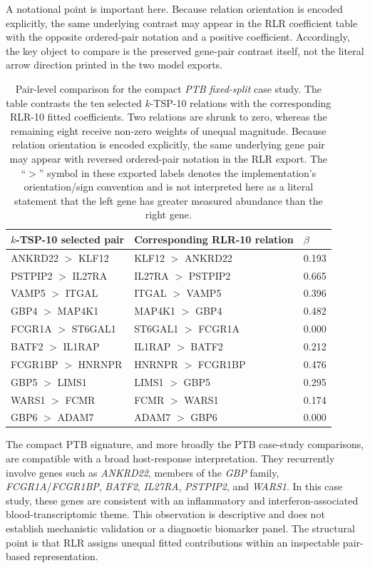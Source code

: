 \documentclass[11pt, a4paper]{article}
\newcommand{\stdtablefont}{\small}
\newcommand{\stdtablelayout}{%
  \stdtablefont
  \setlength{\tabcolsep}{4pt}
  \renewcommand{\arraystretch}{1.2}
}
\begin{document}
A notational point is important here. Because relation orientation is encoded explicitly, the same underlying contrast may appear in the RLR coefficient table with the opposite ordered-pair notation and a positive coefficient. Accordingly, the key object to compare is the preserved gene-pair contrast itself, not the literal arrow direction printed in the two model exports.

\begin{table}[!htbp]
\centering
\caption{Pair-level comparison for the compact \emph{PTB fixed-split} case study. The table contrasts the ten selected $k$-TSP-10 relations with the corresponding RLR-10 fitted coefficients. Two relations are shrunk to zero, whereas the remaining eight receive non-zero weights of unequal magnitude. Because relation orientation is encoded explicitly, the same underlying gene pair may appear with reversed ordered-pair notation in the RLR export. The ``$>$'' symbol in these exported labels denotes the implementation's orientation/sign convention and is not interpreted here as a literal statement that the left gene has greater measured abundance than the right gene.}
\label{tab:ptb_compact_pairs}
{\stdtablelayout
\begin{tabular}{L{0.38\textwidth}L{0.30\textwidth}C{0.14\textwidth}}
\toprule
\textbf{$k$-TSP-10 selected pair} & \textbf{Corresponding RLR-10 relation} & \textbf{$\beta$} \\
\midrule
ANKRD22 $>$ KLF12   & KLF12 $>$ ANKRD22   & 0.193 \\
PSTPIP2 $>$ IL27RA  & IL27RA $>$ PSTPIP2  & 0.665 \\
VAMP5 $>$ ITGAL     & ITGAL $>$ VAMP5     & 0.396 \\
GBP4 $>$ MAP4K1     & MAP4K1 $>$ GBP4     & 0.482 \\
FCGR1A $>$ ST6GAL1  & ST6GAL1 $>$ FCGR1A  & 0.000 \\
BATF2 $>$ IL1RAP    & IL1RAP $>$ BATF2    & 0.212 \\
FCGR1BP $>$ HNRNPR  & HNRNPR $>$ FCGR1BP  & 0.476 \\
GBP5 $>$ LIMS1      & LIMS1 $>$ GBP5      & 0.295 \\
WARS1 $>$ FCMR      & FCMR $>$ WARS1      & 0.174 \\
GBP6 $>$ ADAM7      & ADAM7 $>$ GBP6      & 0.000 \\
\bottomrule
\end{tabular}
}
\end{table}

The compact PTB signature, and more broadly the PTB case-study comparisons, are compatible with a broad host-response interpretation.
They recurrently involve genes such as \emph{ANKRD22}, members of the \emph{GBP} family, \emph{FCGR1A}/\emph{FCGR1BP}, \emph{BATF2}, \emph{IL27RA}, \emph{PSTPIP2}, and \emph{WARS1}. In this case study, these genes are consistent with an inflammatory and interferon-associated blood-transcriptomic theme. This observation is descriptive and does not establish mechanistic validation or a diagnostic biomarker panel. The structural point is that RLR assigns unequal fitted contributions within an inspectable pair-based representation.
\end{document}

